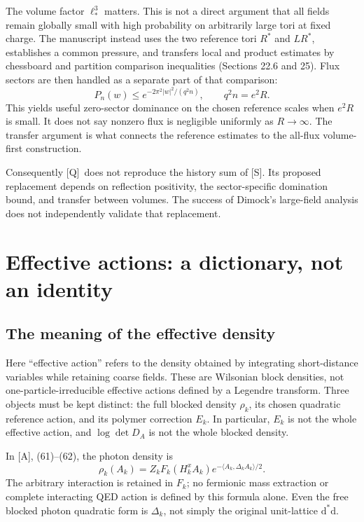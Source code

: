 \documentclass[11pt]{article}
\numberwithin{equation}{section}
\newcommand{\dd}{\mathrm d}
\newcommand{\Q}{\textup{[Q]}}
\newcommand{\AG}{\textup{[A]}}
\newcommand{\US}{\textup{[S]}}
\begin{document}
The volume factor $\ell_*^3$ matters. This is not a direct argument
that all fields remain globally small with high probability on
arbitrarily large tori at fixed charge. The manuscript instead uses
the two reference tori $R^*$ and $LR^*$, establishes a common pressure,
and transfers local and product estimates by chessboard and partition
comparison inequalities (Sections 22.6 and 25).
Flux sectors are then handled as a separate part of that comparison:
\begin{equation}
 P_n(w)\le e^{-2\pi^2|w|^2/(q^2n)},\qquad q^2n=e^2R.
\end{equation}
This yields useful zero-sector dominance on the chosen reference
scales when $e^2R$ is small. It does not say nonzero flux is negligible
uniformly as $R\to\infty$. The transfer argument is what connects
the reference estimates to the all-flux volume-first construction.

Consequently \Q\ does not reproduce the history sum of \US.
Its proposed replacement depends on reflection positivity, the
sector-specific domination bound, and transfer between volumes.
The success of Dimock's large-field analysis does not independently
validate that replacement.

\section{Effective actions: a dictionary, not an identity}

\subsection{The meaning of the effective density}

Here ``effective action'' refers to the density obtained by integrating
short-distance variables while retaining coarse fields. These are
Wilsonian block densities, not one-particle-irreducible effective
actions defined by a Legendre transform. Three objects must be kept
distinct: the full blocked density $\rho_k$, its chosen quadratic
reference action, and its polymer correction $E_k$. In particular,
$E_k$ is not the whole effective action, and $\log\det D_A$ is not
the whole blocked density.

In \AG, (61)--(62), the photon density is
\begin{equation}
 \rho_k(A_k)=Z_k F_k(H_k^xA_k)
               e^{-\langle A_k,\Delta_kA_k\rangle/2}.
\end{equation}
The arbitrary interaction is retained in $F_k$; no fermionic mass
extraction or complete interacting QED action is defined by this
formula alone. Even the free blocked photon quadratic form is
$\Delta_k$, not simply the original unit-lattice $\dd^*\dd$.
\end{document}
